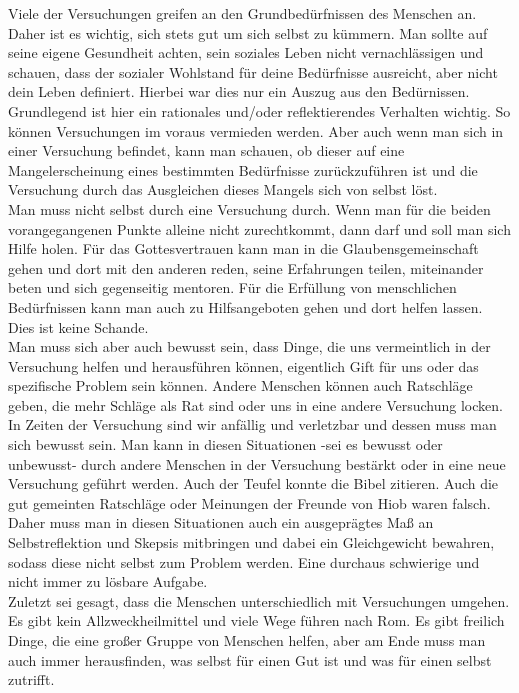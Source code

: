 Viele der Versuchungen greifen an den Grundbedürfnissen des Menschen an. Daher ist es wichtig, sich stets gut um sich
selbst zu kümmern. Man sollte auf seine eigene Gesundheit achten, sein soziales Leben nicht vernachlässigen und
schauen, dass der sozialer Wohlstand für deine Bedürfnisse ausreicht, aber nicht dein Leben definiert. Hierbei war dies
nur ein Auszug aus den Bedürnissen. Grundlegend ist hier ein rationales und/oder reflektierendes Verhalten wichtig. So
können Versuchungen im voraus vermieden werden. Aber auch wenn man sich in einer Versuchung befindet, kann man schauen,
ob dieser auf eine Mangelerscheinung eines bestimmten Bedürfnisse zurückzuführen ist und die Versuchung durch das
Ausgleichen dieses Mangels sich von selbst löst. \\

Man muss nicht selbst durch eine Versuchung durch. Wenn man für die beiden vorangegangenen Punkte alleine nicht
zurechtkommt, dann darf und soll man sich Hilfe holen. Für das Gottesvertrauen kann man in die Glaubensgemeinschaft
gehen und dort mit den anderen reden, seine Erfahrungen teilen, miteinander beten und sich gegenseitig mentoren. Für
die Erfüllung von menschlichen Bedürfnissen kann man auch zu Hilfsangeboten gehen und dort helfen lassen. Dies ist
keine Schande. \\

Man muss sich aber auch bewusst sein, dass Dinge, die uns vermeintlich in der Versuchung helfen und herausführen
können, eigentlich Gift für uns oder das spezifische Problem sein können. Andere Menschen können auch Ratschläge geben,
die mehr Schläge als Rat sind oder uns in eine andere Versuchung locken. In Zeiten der Versuchung sind wir anfällig und
verletzbar und dessen muss man sich bewusst sein. Man kann in diesen Situationen -sei es bewusst oder unbewusst- durch
andere Menschen in der Versuchung bestärkt oder in eine neue Versuchung geführt werden. Auch der Teufel konnte die
Bibel zitieren. Auch die gut gemeinten Ratschläge oder Meinungen der Freunde von Hiob waren falsch. Daher muss man in
diesen Situationen auch ein ausgeprägtes Maß an Selbstreflektion und Skepsis mitbringen und dabei ein Gleichgewicht
bewahren, sodass diese nicht selbst zum Problem werden. Eine durchaus schwierige und nicht immer zu lösbare Aufgabe. \\

Zuletzt sei gesagt, dass die Menschen unterschiedlich mit Versuchungen umgehen. Es gibt kein Allzweckheilmittel und
viele Wege führen nach Rom. Es gibt freilich Dinge, die eine großer Gruppe von Menschen helfen, aber am Ende muss man
auch immer herausfinden, was selbst für einen Gut ist und was für einen selbst zutrifft.

